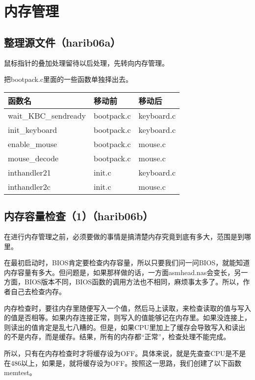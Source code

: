 ﻿\chapter{	内存管理	}
\section{	整理源文件（harib06a）	}
鼠标指针的叠加处理留待以后处理，先转向内存管理。

把bootpack.c里面的一些函数单独择出去。
\begin{table}[!ht]
  \centering
  \begin{tabular}{|l|l|l|}
  \hline
  函数名 & 移动前 & 移动后 \\\hline
    wait\_KBC\_sendready&	bootpack.c&	keyboard.c\\
    init\_keyboard&	bootpack.c&	keyboard.c\\
    enable\_mouse&	bootpack.c&	mouse.c\\
    mouse\_decode&	bootpack.c&	mouse.c\\
    inthandler21&	init.c&	keyboard.c\\
    inthandler2c&	init.c&	mouse.c\\
    \hline
\end{tabular}
\end{table}

\section{	内存容量检查（1）（harib06b）	}

在进行内存管理之前，必须要做的事情是搞清楚内存究竟到底有多大，范围是到哪里。

在最初启动时，BIOS肯定要检查内存容量，所以只要我们问一问BIOS，就能知道内存容量有多大。但问题是，如果那样做的话，一方面asmhead.nas会变长，另一方面，BIOS版本不同，BIOS函数的调用方法也不相同，麻烦事太多了。所以，作者自己去检查内存。

内存检查时，要往内存里随便写入一个值，然后马上读取，来检查读取的值与写入的值是否相等。如果内存连接正常，则写入的值能够记在内存里。如果没连接上，则读出的值肯定是乱七八糟的。但是，如果CPU里加上了缓存会导致写入和读出的不是内存，而是缓存。结果，所有的内存都“正常”，检查处理不能完成。

所以，只有在内存检查时才将缓存设为OFF。具体来说，就是先查查CPU是不是在486以上，如果是，就将缓存设为OFF。按照这一思路，我们创建了以下函数memtest。

